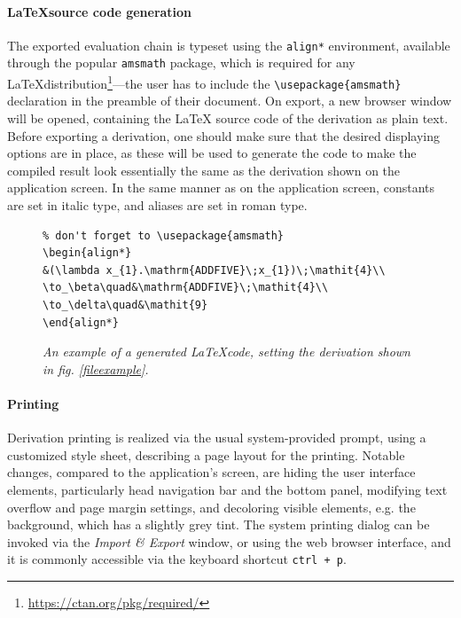 \documentclass[table, a4paper, 10pt]{article}
\begin{document}
\paragraph{\LaTeX\;source code generation}
The exported evaluation chain is typeset using the \texttt{align*} environment,
available through the popular \texttt{amsmath} package, which is required for
any \LaTeX\;distribution\footnote{\url{https://ctan.org/pkg/required/}}---the
user has to include the \verb|\usepackage{amsmath}| declaration in the 
preamble of their document. On export, a new browser window
will be opened, containing the \LaTeX\; source code of the derivation as plain text.
Before exporting a derivation, one should make sure that the desired
displaying options are in place, as these will be used to generate the code to
make the compiled result look essentially the same as the derivation shown on the application screen.
In the same manner as on the  
application screen, constants are set in italic type, and aliases are set in roman type.

\begin{figure}[H]
\begin{framed}
\begin{verbatim}
% don't forget to \usepackage{amsmath}
\begin{align*}
&(\lambda x_{1}.\mathrm{ADDFIVE}\;x_{1})\;\mathit{4}\\
\to_\beta\quad&\mathrm{ADDFIVE}\;\mathit{4}\\
\to_\delta\quad&\mathit{9}
\end{align*}
\end{verbatim}
\vspace{-0.3cm}
\end{framed}
\vspace{-0.4cm}
\caption{\textit{An example of a generated \LaTeX\;code, setting the derivation shown
in fig. \ref{fileexample}.}}\label{latexexample}
\end{figure}

\paragraph{Printing} Derivation printing is realized via the usual system-provided prompt,
using a customized style sheet, describing a page layout for the printing. Notable changes,
compared to the application's screen, are hiding the user interface elements, particularly
head navigation bar and the bottom panel, modifying text overflow and page margin settings, and
decoloring visible elements, e.g. the background, which has a slightly grey tint.
The system printing dialog can be invoked via the \textit{Import \& Export} window,
or using the web browser interface, and it is commonly accessible via the keyboard shortcut \texttt{ctrl + p}.
\end{document}
